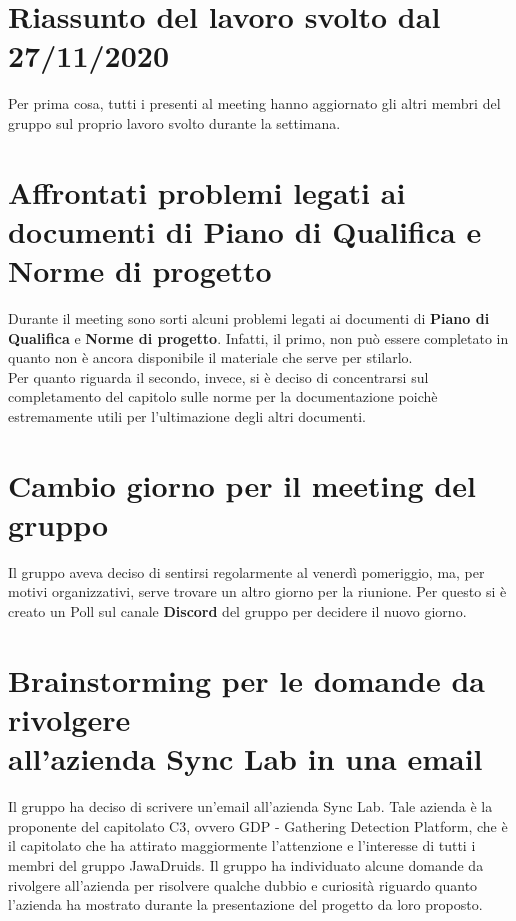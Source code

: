 	\section{Riassunto del lavoro svolto dal 27/11/2020}
	Per prima cosa, tutti i presenti al meeting hanno aggiornato gli altri membri del gruppo sul proprio lavoro svolto durante la settimana.
	
	\section{Affrontati problemi legati ai documenti di Piano di Qualifica e Norme di progetto}
	Durante il meeting sono sorti alcuni problemi legati ai documenti di \textbf{Piano di Qualifica} e \textbf{Norme di progetto}. Infatti, il primo, non può essere completato in quanto non è ancora disponibile il materiale che serve per stilarlo. \\
	Per quanto riguarda il secondo, invece, si è deciso di concentrarsi sul completamento del capitolo sulle norme per la documentazione poichè estremamente utili per l'ultimazione degli altri documenti.
	
	\section{Cambio giorno per il meeting del gruppo}
	Il gruppo aveva deciso di sentirsi regolarmente al venerdì pomeriggio, ma, per motivi organizzativi, serve trovare un altro giorno per la riunione. Per questo si è creato un Poll sul canale \textbf{Discord} del gruppo per decidere il nuovo giorno.
	
	\section{Brainstorming per le domande da rivolgere \\all'azienda Sync Lab in una email} 
	Il gruppo ha deciso di scrivere un'email all'azienda Sync Lab. Tale azienda è la proponente del capitolato C3, ovvero GDP - Gathering Detection Platform, che è il capitolato che ha attirato maggiormente l'attenzione e l'interesse di tutti i membri del gruppo JawaDruids. Il gruppo ha individuato alcune domande da rivolgere all'azienda per risolvere qualche dubbio e curiosità riguardo quanto l'azienda ha mostrato durante la presentazione del progetto da loro proposto. 
	
